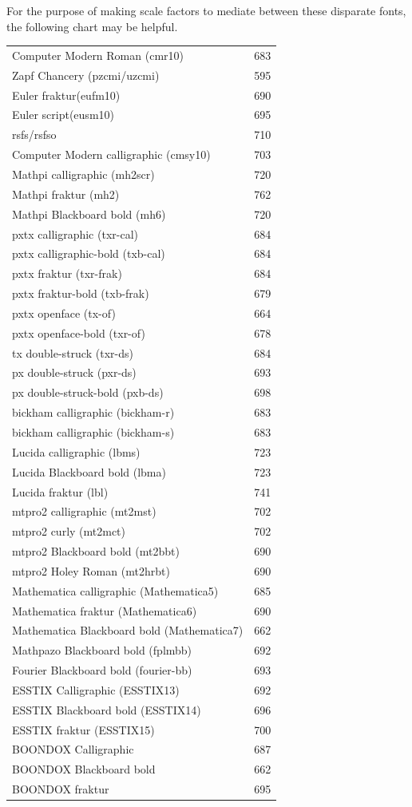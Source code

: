 \documentclass[11pt]{article}
\begin{document}
 For the purpose of making scale factors to mediate between these disparate fonts, the following chart may be helpful.

\begin{longtable}{l r}
Computer Modern Roman (cmr10)&683\\
Zapf Chancery (pzcmi/uzcmi)&595\\
Euler fraktur(eufm10)&690\\
Euler script(eusm10)&695\\
rsfs/rsfso&710\\
Computer Modern calligraphic (cmsy10)&703\\
Mathpi calligraphic (mh2scr)&720\\
Mathpi fraktur (mh2)&762\\
Mathpi Blackboard bold (mh6)&720\\
pxtx calligraphic (txr-cal)&684\\
pxtx calligraphic-bold (txb-cal)&684\\
pxtx fraktur (txr-frak)&684\\
pxtx fraktur-bold (txb-frak)&679\\
pxtx openface (tx-of)&664\\
pxtx openface-bold (txr-of)&678\\
tx double-struck (txr-ds)&684\\
px double-struck (pxr-ds)&693\\
px double-struck-bold (pxb-ds)&698\\
bickham calligraphic (bickham-r)&683\\
bickham calligraphic (bickham-s)&683\\
Lucida calligraphic (lbms)&723\\
Lucida Blackboard bold (lbma)&723\\
Lucida fraktur (lbl)&741\\
mtpro2 calligraphic (mt2mst)&702\\
mtpro2 curly (mt2mct)&702\\
mtpro2 Blackboard bold (mt2bbt)&690\\
mtpro2 Holey Roman (mt2hrbt)&690\\
Mathematica calligraphic (Mathematica5)&685\\
Mathematica fraktur (Mathematica6)&690\\
Mathematica Blackboard bold (Mathematica7)&662\\
Mathpazo Blackboard bold (fplmbb)&692\\
Fourier Blackboard bold (fourier-bb)&693\\
ESSTIX Calligraphic (ESSTIX13)&692\\
ESSTIX Blackboard bold (ESSTIX14)&696\\
ESSTIX fraktur (ESSTIX15)&700\\
BOONDOX Calligraphic &687\\
BOONDOX Blackboard bold &662\\
BOONDOX fraktur &695
\end{longtable}
\end{document}
